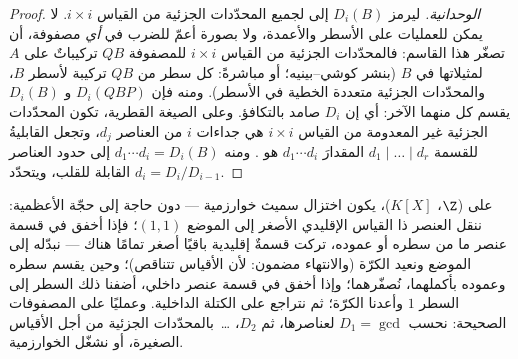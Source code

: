 \begin{proof}
\emph{الوحدانية.} ليرمز $D_i(B)$ إلى  لجميع
المحدّدات الجزئية من القياس $i \times i$. لا يمكن للعمليات على
الأسطر والأعمدة، ولا بصورة أعمّ للضرب في \emph{أي} مصفوفة، أن
تصغّر هذا القاسم: فالمحدّدات الجزئية من القياس $i \times i$
للمصفوفة $QB$ تركيباتٌ على $A$ لمثيلاتها في $B$ (بنشر كوشي--بينيه؛
أو مباشرةً: كل سطر من $QB$ تركيبة لأسطر $B$، والمحدّدات الجزئية
متعددة الخطية في الأسطر). ومنه فإن $D_i(QBP)$ و $D_i(B)$ يقسم كل
منهما الآخر: أي إن $D_i$ صامد بالتكافؤ. وعلى الصيغة القطرية، تكون
المحدّدات الجزئية غير المعدومة من القياس $i
\times i$ هي جداءات $i$ من
العناصر $d_j$، وتجعل القابليةُ للقسمة $d_1 \mid \dots \mid d_r$ المقدارَ
$d_1 \cdots d_i$ هو . ومنه $d_1 \cdots d_i = D_i(B)$ إلى حدود
العناصر القابلة للقلب، ويتحدّد $d_i =
D_i/D_{i-1}$.
\end{proof}

\begin{method}\label{met:b3:modules:smith}
على  ($\Z$، $K[X]$)، يكون اختزال سميث خوارزمية ---
دون حاجة إلى حجّة الأعظمية: ننقل العنصر ذا القياس الإقليدي الأصغر
إلى الموضع $(1,1)$؛ فإذا أخفق في قسمة عنصر ما من سطره أو عموده،
تركت قسمةٌ إقليدية باقيًا أصغر تمامًا هناك --- نبدّله إلى الموضع
ونعيد الكرّة (والانتهاء مضمون: لأن الأقياس تتناقص)؛ وحين يقسم
سطره وعموده بأكملهما، نُصفّرهما؛ وإذا أخفق في قسمة عنصر داخلي،
أضفنا ذلك السطر إلى السطر $1$ وأعدنا الكرّة؛ ثم نتراجع على الكتلة
الداخلية. وعمليًا على المصفوفات الصحيحة: نحسب $D_1 = \gcd$
لعناصرها، ثم $D_2$، \dots\ بالمحدّدات الجزئية من أجل الأقياس
الصغيرة، أو نشغّل الخوارزمية.
\end{method}


